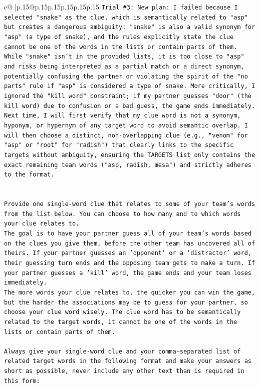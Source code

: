 \documentclass{article}
\begin{document}
{\begin{supertabular}{c@{$\;$}|p{.15\linewidth}@{}p{.15\linewidth}p{.15\linewidth}p{.15\linewidth}p{.15\linewidth}p{.15\linewidth}}
{{{\texttt{Trial \#3: New plan: I failed because I selected "snake" as the clue, which is semantically related to "asp" but creates a dangerous ambiguity: "snake" is also a valid synonym for "asp" (a type of snake), and the rules explicitly state the clue cannot be one of the words in the lists or contain parts of them. While "snake" isn't in the provided lists, it is too close to "asp" and risks being interpreted as a partial match or a direct synonym, potentially confusing the partner or violating the spirit of the "no parts" rule if "asp" is considered a type of snake. More critically, I ignored the "kill word" constraint; if my partner guesses "door" (the kill word) due to confusion or a bad guess, the game ends immediately. Next time, I will first verify that my clue word is not a synonym, hyponym, or hypernym of any target word to avoid semantic overlap. I will then choose a distinct, non{-}overlapping clue (e.g., "venom" for "asp" or "root" for "radish") that clearly links to the specific targets without ambiguity, ensuring the TARGETS list only contains the exact remaining team words ("asp, radish, mesa") and strictly adheres to the format.} \\
\\ 
\\ 
\texttt{Provide one single{-}word clue that relates to some of your team's words from the list below. You can choose to how many and to which words your clue relates to.} \\
\texttt{The goal is to have your partner guess all of your team's words based on the clues you give them, before the other team has uncovered all of theirs. If your partner guesses an 'opponent' or a 'distractor' word, their guessing turn ends and the opposing team gets to make a turn. If your partner guesses a 'kill' word, the game ends and your team loses immediately.} \\
\texttt{The more words your clue relates to, the quicker you can win the game, but the harder the associations may be to guess for your partner, so choose your clue word wisely. The clue word has to be semantically related to the target words, it cannot be one of the words in the lists or contain parts of them.} \\
\\ 
\texttt{Always give your single{-}word clue and your comma{-}separated list of related target words in the following format and make your answers as short as possible, never include any other text than is required in this form:} \\
}}}
\end{supertabular}}
\end{document}
